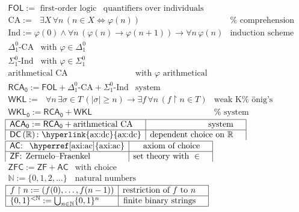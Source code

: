 \documentclass[11pt,reqno]{amsart}
\providecommand{\N}{\mathbb{N}}
\theoremstyle{redplain}
\numberwithin{equation}{section}
\begin{document}
\begin{center}
$%
\begin{array}{|l|rc|}
\hline
\mathsf{FOL}:=\text{ first-order logic} & \text{quantifiers over individuals}
& 
\end{array}%
$ \noindent $%
\begin{array}{|l|rc|}
\hline
\text{CA}:=\text{ }\exists X\,\forall n\,(n\in X\iff \varphi (n)) & \text{%
comprehension scheme} &  \\ \hline
\text{Ind}:=\varphi (0)\wedge \forall n\,(\varphi (n)\rightarrow \varphi
(n+1))\rightarrow \forall n\,\varphi (n) & \text{induction scheme} & 
\end{array}%
$ \noindent $%
\begin{array}{|l|rc|}
\hline
\Delta _{1}^{0}\text{-CA} & \text{with }\varphi \in \Delta _{1}^{0} &  \\ 
\hline
\Sigma _{1}^{0}\text{-Ind} & \text{with }\varphi \in \Sigma _{1}^{0} & 
\end{array}%
$ \noindent $%
\begin{array}{|l|rc|}
\hline
\text{arithmetical CA} & \text{with }\varphi \text{ arithmetical} &  \\ 
\hline
\mathsf{RCA}_{\mathsf{0}}:=\mathsf{FOL}+\Delta _{1}^{0}\text{-CA}+\Sigma
_{1}^{0}\text{-Ind} & \text{system} & 
\end{array}%
$ \noindent $%
\begin{array}{|l|rc|}
\hline
\mathsf{WKL:=}\text{ }\forall n\,\exists \sigma \in T\,(|\sigma |\geq
n)\rightarrow \exists f\,\forall n\,(f\upharpoonright n\in T) & \text{weak K%
\"{o}nig's lemma} &  \\ \hline
\mathsf{WKL}_{\mathsf{0}}:=\mathsf{RCA}_{\mathsf{0}}+\mathsf{WKL} & \text{%
system} & 
\end{array}%
$ \noindent $%
\begin{array}{|l|rc|}
\hline
\mathsf{ACA}_{\mathsf{0}}:=\mathsf{RCA}_{\mathsf{0}}+\text{arithmetical CA}
& \text{system} &  \\ \hline
\mathsf{DC}\left( \mathbb{R}\right) \mathsf{:}\text{ \text{\hyperlink{ax:dc}{%
ax:dc}}} & \text{dependent choice on }\mathbb{R} & 
\end{array}%
$ \noindent $%
\begin{array}{|l|rc|}
\hline
\mathsf{AC}\text{\textsf{:} \ \text{\hyperref[axi:ac]{axi:ac}}} & \text{%
axiom of choice} &  \\ \hline
\mathsf{ZF}\text{\textsf{: }Zermelo--Fraenkel} & \text{set theory with }\in
& 
\end{array}%
$ \noindent $%
\begin{array}{|l|rc|}
\hline
\mathsf{ZFC:=ZF}+\mathsf{AC} & \text{with choice} &  \\ \hline
\N:=\{0,1,2,\dots \} & \text{natural numbers} & 
\end{array}%
$ \noindent $%
\begin{array}{|l|rc|}
\hline
f\upharpoonright n:=(f(0),\dots ,f(n-1)) & \text{restriction of }f\text{ to }%
n &  \\ \hline
\{0,1\}^{<\N}:=\bigcup_{n\in \N}\{0,1\}^{n} & \text{finite binary strings} & 
\\ \hline
\end{array}%
$
\end{center}
\end{document}
